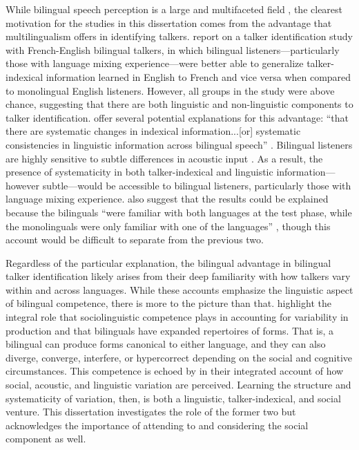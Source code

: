 While bilingual speech perception is a large and multifaceted field \citep{ingvalson_2014_bilingual}, the clearest motivation for the studies in this dissertation comes from the advantage that multilingualism offers in identifying talkers. \citet{orena_2019_identifying} report on a talker identification study with French-English bilingual talkers, in which bilingual listeners---particularly those with language mixing experience---were better able to generalize talker-indexical information learned in English to French and vice versa when compared to monolingual English listeners. However, all groups in the study were above chance, suggesting that there are both linguistic and non-linguistic components to talker identification. \citeauthor{orena_2019_identifying} offer several potential explanations for this advantage: ``that there are systematic changes in indexical information...[or] systematic consistencies in linguistic information across bilingual speech'' \citeyearpar[][p. EL308]{orena_2019_identifying}. Bilingual listeners are highly sensitive to subtle differences in acoustic input \citep{ju_2004_falling}. As a result, the presence of systematicity in both talker-indexical and linguistic information---however subtle---would be accessible to bilingual listeners, particularly those with language mixing experience. \citeauthor{orena_2019_identifying} also suggest that the results could be explained because the bilinguals ``were familiar with both languages at the test phase, while the monolinguals were only familiar with one of the languages'' \citeyearpar[][p. EL309]{orena_2019_identifying}, though this account would be difficult to separate from the previous two. 

Regardless of the particular explanation, the bilingual advantage in bilingual talker identification likely arises from their deep familiarity with how talkers vary within and across languages. While these accounts emphasize the linguistic aspect of bilingual competence, there is more to the picture than that. \citet{bullock_2009_sociophonetics} highlight the integral role that sociolinguistic competence plays in accounting for variability in production and that bilinguals have expanded repertoires of forms. That is, a bilingual can produce forms canonical to either language, and they can also diverge, converge, interfere, or hypercorrect depending on the social and cognitive circumstances. This competence is echoed by \citet{kleinschmidt_2018_sociolinguistic} in their integrated account of how social, acoustic, and linguistic variation are perceived. Learning the structure and systematicity of variation, then, is both a linguistic, talker-indexical, and social venture. This dissertation investigates the role of the former two but acknowledges the importance of attending to and considering the social component as well.

